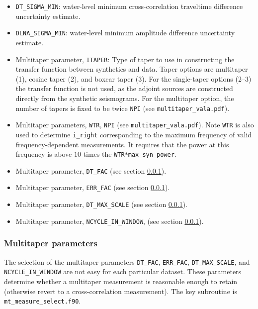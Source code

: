\documentclass[11pt,titlepage,fleqn]{article}
\newcommand{\refSec}[1]{section \ref{#1}}
\begin{document}
\begin{itemize}
\item \verb+DT_SIGMA_MIN+: water-level minimum cross-correlation traveltime difference uncertainty estimate.

\item \verb+DLNA_SIGMA_MIN+: water-level minimum amplitude difference uncertainty estimate.

\item Multitaper parameter, \verb+ITAPER+: Type of taper to use in constructing the transfer function between synthetics and data. Taper options are multitaper (1), cosine taper (2), and boxcar taper (3).  For the single-taper options (2--3) the transfer function is not used, as the adjoint sources are constructed directly from the synthetic seismograms. For the multitaper option, the number of tapers is fixed to be twice \verb+NPI+ (see \verb+multitaper_vala.pdf+).

\item Multitaper parameters, \verb+WTR+, \verb+NPI+ (see \verb+multitaper_vala.pdf+). Note \verb+WTR+ is also used to
determine \verb+i_right+ corresponding to the maximum frequency of valid frequency-dependent measurements. It requires
that the power at this frequency is above $10$ times the \verb+WTR*max_syn_power+.

\item Multitaper parameter, \verb+DT_FAC+ (see \refSec{sec:MTparm}).

\item Multitaper parameter, \verb+ERR_FAC+ (see \refSec{sec:MTparm}).

\item Multitaper parameter, \verb+DT_MAX_SCALE+ (see \refSec{sec:MTparm}).

\item Multitaper parameter, \verb+NCYCLE_IN_WINDOW+, (see \refSec{sec:MTparm}).
\end{itemize}


\subsubsection{Multitaper parameters}
\label{sec:MTparm}

The selection of the multitaper parameters \verb+DT_FAC+, \verb+ERR_FAC+, \verb+DT_MAX_SCALE+, and \verb+NCYCLE_IN_WINDOW+ are not easy for each particular dataset.  These parameters determine whether a multitaper measurement is reasonable enough to retain (otherwise revert to a cross-correlation measurement). The key subroutine is \verb+mt_measure_select.f90+.
\end{document}
